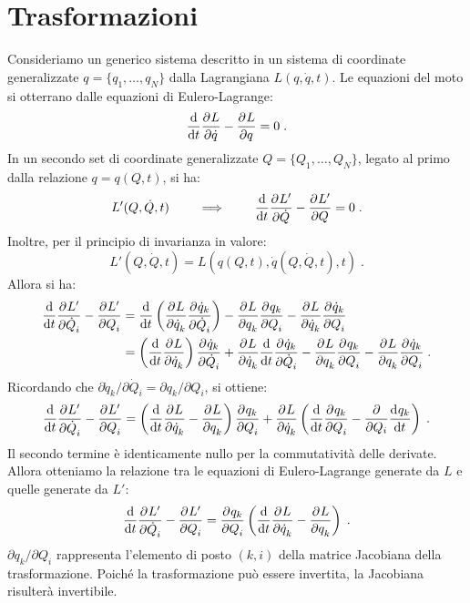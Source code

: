 \section{Trasformazioni}
Consideriamo un generico sistema descritto in un sistema di coordinate generalizzate $q=\{q_1,\ldots,q_N\}$ dalla Lagrangiana $L(q,\dot{q},t)$. Le equazioni del moto si otterrano dalle equazioni di Eulero-Lagrange:
\begin{equation}
\frac{\mathrm{d}}{\mathrm{d}{t}}\frac{\partial^{}L}{\partial \dot{q}^{}}-\frac{\partial^{}L}{\partial q^{}}=0\;.
\end{equation}
In un secondo set di coordinate generalizzate $Q=\{Q_1,\ldots,Q_N\}$, legato al primo dalla relazione $q=q(Q,t)$, si ha:
\begin{equation}
L'(Q,\dot{Q},t)\qquad \implies\qquad \frac{\mathrm{d}}{\mathrm{d}{t}}\frac{\partial^{}L'}{\partial \dot{Q}^{}}-\frac{\partial^{}L'}{\partial Q^{}}=0\;.
\end{equation}
Inoltre, per il principio di invarianza in valore:
\begin{equation}
L'(Q,\dot{Q},t)=L(q(Q,t),\dot{q}(Q,\dot{Q},t),t)\;.
\end{equation}
Allora si ha:
\begin{align}
\frac{\mathrm{d}}{\mathrm{d}{t}}\frac{\partial^{}L'}{\partial \dot{Q}_i^{}}-\frac{\partial^{}L'}{\partial Q_i^{}} &= \frac{\mathrm{d}}{\mathrm{d}{t}}\left(\frac{\partial^{}L}{\partial \dot{q}_k^{}}\frac{\partial^{}\dot{q}_k}{\partial \dot{Q}_i^{}}\right)-\frac{\partial^{}L}{\partial q_k^{}}\frac{\partial^{}q_k}{\partial Q_i^{}}-\frac{\partial^{}L}{\partial \dot{q}_k^{}}\frac{\partial^{}\dot{q}_k}{\partial Q_i^{}} \notag \\
&= \left(\frac{\mathrm{d}}{\mathrm{d}{t}}\frac{\partial^{}L}{\partial \dot{q}_k^{}}\right)\frac{\partial^{}\dot{q}_k}{\partial \dot{Q}_i^{}}+\frac{\partial^{}L}{\partial \dot{q}_k^{}}\frac{\mathrm{d}}{\mathrm{d}{t}}\frac{\partial^{}\dot{q}_k}{\partial \dot{Q}_i^{}}-\frac{\partial^{}L}{\partial q_k^{}}\frac{\partial^{}q_k}{\partial Q_i^{}}-\frac{\partial^{}L}{\partial q_k^{}}\frac{\partial^{}\dot{q}_k}{\partial Q_i^{}}\;.
\end{align}
Ricordando che $\partial\dot{q}_k/\partial\dot{Q}_i=\partial q_k/\partial Q_i$, si ottiene:
\begin{equation}
\frac{\mathrm{d}}{\mathrm{d}{t}}\frac{\partial^{}L'}{\partial \dot{Q}_i^{}}-\frac{\partial^{}L'}{\partial Q_i^{}} = \left(\frac{\mathrm{d}}{\mathrm{d}{t}}\frac{\partial^{}L}{\partial \dot{q}_k^{}}-\frac{\partial^{}L}{\partial q_k^{}}\right)\frac{\partial^{}q_k}{\partial Q_i^{}}+\frac{\partial^{}L}{\partial \dot{q}_k^{}}\left(\frac{\mathrm{d}}{\mathrm{d}{t}}\frac{\partial^{}q_k}{\partial Q_i^{}}-\frac{\partial}{\partial Q_i}\frac{\mathrm{d}^{}q_k}{\mathrm{d}t^{}}\right)\;.
\end{equation}
Il secondo termine è identicamente nullo per la commutatività delle derivate. Allora otteniamo la relazione tra le equazioni di Eulero-Lagrange generate da $L$ e quelle generate da $L'$:
\begin{equation}
\frac{\mathrm{d}}{\mathrm{d}{t}}\frac{\partial^{}L'}{\partial \dot{Q}_i^{}}-\frac{\partial^{}L'}{\partial Q_i^{}}=\frac{\partial^{}q_k}{\partial Q_i^{}}\left(\frac{\mathrm{d}}{\mathrm{d}{t}}\frac{\partial^{}L}{\partial \dot{q}_k^{}}-\frac{\partial^{}L}{\partial q_k^{}}\right)\;.
\end{equation}
$\partial q_k/\partial Q_i$ rappresenta l'elemento di posto $(k,i)$ della matrice Jacobiana della trasformazione. Poiché la trasformazione può essere invertita, la Jacobiana risulterà invertibile.
\pagebreak
